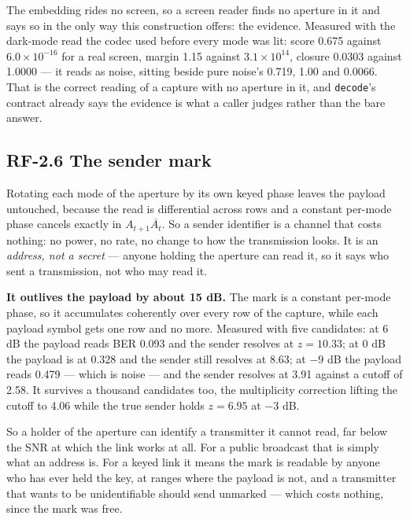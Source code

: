 \documentclass[10pt,letterpaper,twocolumn]{article}
\begin{document}
The embedding rides no screen, so a screen reader finds no aperture in it and says so in the only way this construction offers: the evidence. Measured with the dark-mode read the codec used before every mode was lit: score 0.675 against \(6.0\times10^{-16}\) for a real screen, margin 1.15 against \(3.1\times10^{14}\), closure 0.0303 against 1.0000 --- it reads as noise, sitting beside pure noise's 0.719, 1.00 and 0.0066. That is the correct reading of a capture with no aperture in it, and \texttt{decode}'s contract already says the evidence is what a caller judges rather than the bare answer.

\subsection{RF-2.6 The sender mark}\label{rf-26-the-sender-mark}

Rotating each mode of the aperture by its own keyed phase leaves the payload untouched, because the read is differential across rows and a constant per-mode phase cancels exactly in \(A_{t+1}\overline{A_t}\). So a sender identifier is a channel that costs nothing: no power, no rate, no change to how the transmission looks. It is an \emph{address, not a secret} --- anyone holding the aperture can read it, so it says who sent a transmission, not who may read it.

\textbf{It outlives the payload by about 15 dB.} The mark is a constant per-mode phase, so it accumulates coherently over every row of the capture, while each payload symbol gets one row and no more. Measured with five candidates: at 6 dB the payload reads BER 0.093 and the sender resolves at \(z = 10.33\); at 0 dB the payload is at 0.328 and the sender still resolves at 8.63; at \(-9\) dB the payload reads 0.479 --- which is noise --- and the sender resolves at 3.91 against a cutoff of 2.58. It survives a thousand candidates too, the multiplicity correction lifting the cutoff to 4.06 while the true sender holds \(z = 6.95\) at \(-3\) dB.

So a holder of the aperture can identify a transmitter it cannot read, far below the SNR at which the link works at all. For a public broadcast that is simply what an address is. For a keyed link it means the mark is readable by anyone who has ever held the key, at ranges where the payload is not, and a transmitter that wants to be unidentifiable should send unmarked --- which costs nothing, since the mark was free.
\end{document}
